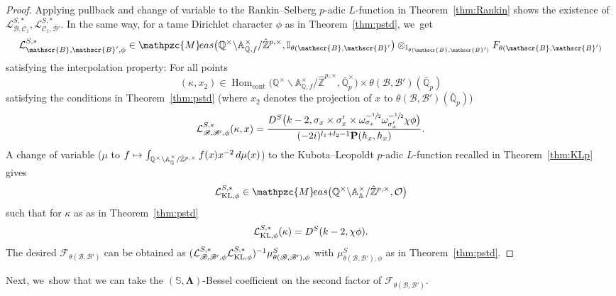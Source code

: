 \documentclass[JEP,XML,SOM,Unicode,published]{cedram}
\newcommand\mto{\mathchoice{\longmapsto}{\mapsto}{\mapsto}{\mapsto}}
\newcommand{\Lfunction}{$L$\nobreakdash-func\-tion\xspace}
\theoremstyle{plain}
\theoremstyle{remark}
\newcommand{\bA}{\mathbb{A}}
\newcommand{\bI}{\mathbb{I}}
\newcommand{\bQ}{\mathbb{Q}}
\newcommand{\bS}{\mathbb{S}}
\newcommand{\bZ}{\mathbb{Z}}
\newcommand{\cF}{\mathcal{F}}
\newcommand{\cL}{\mathcal{L}}
\newcommand{\cO}{\mathcal{O}}
\newcommand{\sB}{\mathscr{B}}
\newcommand{\sC}{\mathscr{C}}
\newcommand{\bfP}{\mathbf{P}}
\newcommand{\Meas}{\mathpzc{M}\mkern-2mu eas}
\newcommand{\cont}{\mathrm{cont}}
\DeclareMathOperator{\Hom}{Hom}
\newcommand{\bLam}{\boldsymbol\Lambda}
\begin{document}
\begin{proof}
Applying pullback and change of variable to the Rankin--Selberg $p$-adic \Lfunction in Theorem~\ref{thm:Rankin} shows the existence of $\cL^{S,*}_{\sB,\sC_1},\cL^{S,\ast}_{\sC_1,\sB'}$. In the same way, for a tame Dirichlet character $\phi$ as in Theorem~\ref{thm:pstd}, we~get
\[
\cL^{S,\ast}_{\sB,\sB',\phi}\in \Meas\bigl(\bQ^\times\backslash \bA^\times_{\bQ,f}/\hat{\bZ}^{p,\times},\bI_{\theta(\sB,\sB'}\bigr)\otimes_{\bI_{\theta(\sB,\sB')}} F_{\theta(\sB,\sB')}
\]
satisfying the interpolation property: For all points
\[
(\kappa,x_2)\in \Hom_\cont\bigl(\bQ^\times\backslash \bA^\times_{\bQ,f}/\hat{\bZ}^{p,\times},\bar{\bQ}^\times_p\bigr)\times \theta(\sB,\sB')(\bar{\bQ}_p)
\]
satisfying the conditions in Theorem~\ref{thm:pstd} (where $x_2$ denotes the projection of $x$ to $ \theta(\sB,\sB')(\bar{\bQ}_p)$)
\begin{align*}
\cL^{S,*}_{\sB,\sB',\phi}(\kappa,x)=\frac{D^S\bigl(k-2,\sigma_{x}\times\sigma'_{x}\times \omega^{-\sfrac{1}{2}}_{\sigma_{x}}\omega^{-\sfrac{1}{2}}_{\sigma'_{x}}\chi\phi\bigr)}{(-2i)^{l_1+l_2-1}\bfP(h_{x},h_{x})}.
\end{align*}
A change of variable (\ie $\mu$ to $f\mto \int_{\bQ^\times\backslash\bA^\times_\bQ/\hat{\bZ}^{p,\times}} f(x)x^{-2}\,d\mu(x)$) to the Kubota--Leopoldt $p$-adic \Lfunction recalled in Theorem~\ref{thm:KLp} gives
\[
\cL^{S,\ast}_{\rm KL,\phi}\in \Meas\bigl(\bQ^\times\backslash\bA^\times_\bA/\hat{\bZ}^{p,\times},\cO\bigr)
\]
such that for $\kappa$ as as in Theorem~\ref{thm:pstd}
\[
\cL^{S,\ast}_{\rm KL,\phi}(\kappa)=D^S(k-2,\chi\phi).
\]
The desired $\cF_{\theta(\sB,\sB')}$ can be obtained as $(\cL^{S,\ast}_{\sB,\sB',\phi}\cL^{S,\ast}_{\rm KL,\phi})^{-1} \mu^S_{\theta(\sB,\sB'),\phi}$ with $\mu^S_{\theta(\sB,\sB'),\phi}$ as in Theorem~\ref{thm:pstd}.
\end{proof}

Next, we~show that we can take the $(\bS,\bLam)$-Bessel coefficient on the second factor of $\cF_{\theta(\sB,\sB')}$.
\end{document}
